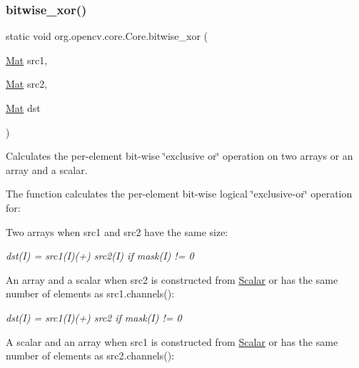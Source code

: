 \subsubsection{\texorpdfstring{bitwise\+\_\+xor()}{bitwise\_xor()}\hspace{0.1cm}{\footnotesize\ttfamily [2/2]}}
{\footnotesize\ttfamily static void org.\+opencv.\+core.\+Core.\+bitwise\+\_\+xor (\begin{DoxyParamCaption}\item[{\mbox{\hyperlink{classorg_1_1opencv_1_1core_1_1_mat}{Mat}}}]{src1,  }\item[{\mbox{\hyperlink{classorg_1_1opencv_1_1core_1_1_mat}{Mat}}}]{src2,  }\item[{\mbox{\hyperlink{classorg_1_1opencv_1_1core_1_1_mat}{Mat}}}]{dst }\end{DoxyParamCaption})\hspace{0.3cm}{\ttfamily [static]}}

Calculates the per-\/element bit-\/wise \char`\"{}exclusive or\char`\"{} operation on two arrays or an array and a scalar.

The function calculates the per-\/element bit-\/wise logical \char`\"{}exclusive-\/or\char`\"{} operation for\+:


\begin{DoxyItemize}
\item Two arrays when {\ttfamily src1} and {\ttfamily src2} have the same size\+: 
\end{DoxyItemize}

{\itshape dst(\+I) = src1(\+I)(+) src2(\+I) if mask(\+I) != 0}


\begin{DoxyItemize}
\item An array and a scalar when {\ttfamily src2} is constructed from {\ttfamily \mbox{\hyperlink{classorg_1_1opencv_1_1core_1_1_scalar}{Scalar}}} or has the same number of elements as {\ttfamily src1.\+channels()}\+: 
\end{DoxyItemize}

{\itshape dst(\+I) = src1(\+I)(+) src2 if mask(\+I) != 0}


\begin{DoxyItemize}
\item A scalar and an array when {\ttfamily src1} is constructed from {\ttfamily \mbox{\hyperlink{classorg_1_1opencv_1_1core_1_1_scalar}{Scalar}}} or has the same number of elements as {\ttfamily src2.\+channels()}\+: 
\end{DoxyItemize}

